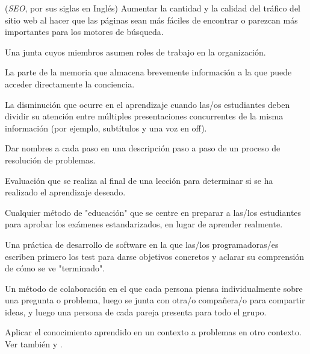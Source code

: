 \begin{description}
 (\emph{SEO}, por sus siglas en Inglés)  Aumentar la cantidad y la calidad del tráfico del sitio web al hacer que las páginas sean más fáciles de encontrar o parezcan más importantes para los motores de búsqueda.

 Una junta cuyos miembros asumen roles de trabajo en la organización.

 La parte de la memoria que almacena brevemente información a la que puede acceder directamente la conciencia.


 La disminución que ocurre 
en el aprendizaje cuando las/os estudiantes deben dividir su atención entre múltiples presentaciones concurrentes de la misma información (por ejemplo, subtítulos y una voz en off).


 Dar nombres a cada paso en una descripción
paso a paso de un proceso de resolución de problemas.

 Evaluación que se realiza al final de una lección para determinar si se ha realizado el aprendizaje deseado.



 Cualquier método de "educación" 
que se centre en preparar a las/los estudiantes para aprobar los exámenes estandarizados, en lugar de aprender realmente.

 Una práctica de desarrollo 
de software en la que las/los programadoras/es escriben primero los test 
para darse objetivos concretos y aclarar su comprensión de cómo se ve "terminado".

 Un método de colaboración 
en el que cada persona piensa individualmente sobre una pregunta o problema,
luego se junta con otra/o compañera/o para compartir ideas, y luego una persona de 
cada pareja presenta para todo el grupo.

 Aplicar el conocimiento aprendido en un contexto a problemas en otro contexto.  Ver también
 y .


\end{description}
